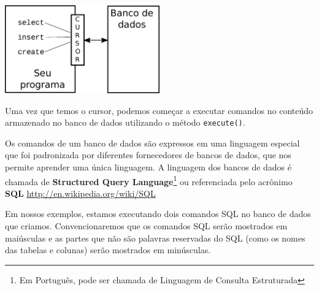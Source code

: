 \beforefig
\centerline{\includegraphics[height=1.50in]{figs2/cursor.eps}}
\afterfig


Uma vez que temos o cursor, podemos começar a executar comandos no conteúdo
armazenado no banco de dados utilizando o método {\tt execute()}.


Os comandos de um banco de dados são expressos em uma linguagem especial que
foi padronizada por diferentes fornecedores de bancos de dados, que nos
permite aprender uma única linguagem. A linguagem dos bancos de dados é
chamada de {\bf Structured Query Language}\footnote{Em Português, pode ser
  chamada de Linguagem de Consulta Estruturada} ou referenciada pelo acrônimo
{\bf SQL}
\url{http://en.wikipedia.org/wiki/SQL}


Em nossos exemplos, estamos executando dois comandos SQL no banco de dados que
criamos. Convencionaremos que os comandos SQL serão mostrados em maiúsculas e
as partes que não são palavras reservadas do SQL (como os nomes das tabelas e
colunas) serão mostrados em minúsculas.


